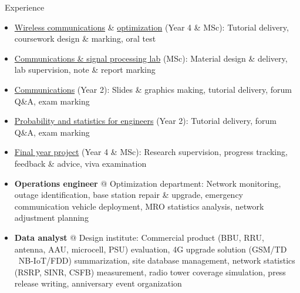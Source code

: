 \documentclass{cv}
\begin{document}
\begin{section}{\faUsers\ Experience}
	\begin{itemize}[rightmargin=60pt]
		\item \href{https://www.youtube.com/watch?v=SFIRXrvvXBQ&list=PL3nE1Yo1b4CrAfN3lndrMImPFuS1hR5U-}{Wireless communications} \& \href{https://www.youtube.com/watch?v=XOcnVQ2HkEQ&list=PL3nE1Yo1b4CoP8t6uPXyFvmqKXGR1nZyP}{optimization} (Year 4 \& MSc): Tutorial delivery, coursework design \& marking, oral test
		\item \href{http://www.ee.ic.ac.uk/msc_csp/ACSPLab.html}{Communications \& signal processing lab} (MSc): Material design \& delivery, lab supervision, note \& report marking
		\item \href{https://github.com/snowztail/imperial/blob/master/EE2%20-%2002%20Communications/Lecture%20Notes/lecture_all.pdf}{Communications} (Year 2): Slides \& graphics making, tutorial delivery, forum Q\&A, exam marking
		\item \href{https://www.youtube.com/watch?v=dkpk5iPsiYM&list=PL3nE1Yo1b4CpcEOgS3s80YUys7nGRqVPM}{Probability and statistics for engineers} (Year 2): Tutorial delivery, forum Q\&A, exam marking
		\item \href{https://intranet.ee.ic.ac.uk/t.clarke/projects/}{Final year project} (Year 4 \& MSc): Research supervision, progress tracking, feedback \& advice, viva examination
	\end{itemize}

	\begin{itemize}[rightmargin=60pt]
		\item \textbf{Operations engineer} @ Optimization department: Network monitoring, outage identification, base station repair \& upgrade, emergency communication vehicle deployment, MRO statistics analysis, network adjustment planning
		\item \textbf{Data analyst} @ Design institute: Commercial product (BBU, RRU, antenna, AAU, microcell, PSU) evaluation, 4G upgrade solution (GSM/TD \textrightarrow\ NB-IoT/FDD) summarization, site database management, network statistics (RSRP, SINR, CSFB) measurement, radio tower coverage simulation, press release writing, anniversary event organization
	\end{itemize}
\end{section}

\vspace{-1.5em}
\end{document}
